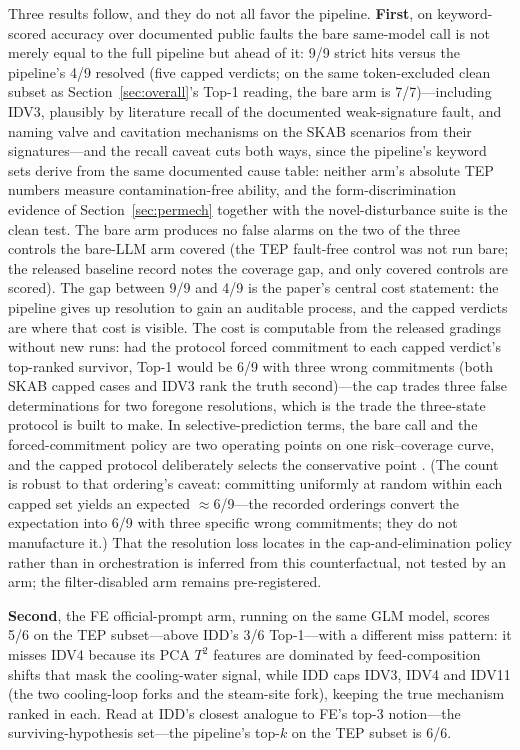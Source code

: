 \documentclass[preprint,10pt]{elsarticle}
\begin{document}
Three results follow, and they do not all favor the pipeline. \textbf{First}, on keyword-scored accuracy over documented public faults the bare same-model call is not merely equal to the full pipeline but ahead of it: 9/9 strict hits versus the pipeline's 4/9 resolved (five capped verdicts; on the same token-excluded clean subset as Section~\ref{sec:overall}'s Top-1 reading, the bare arm is 7/7)---including IDV3, plausibly by literature recall of the documented weak-signature fault, and naming valve and cavitation mechanisms on the SKAB scenarios from their signatures---and the recall caveat cuts both ways, since the pipeline's keyword sets derive from the same documented cause table: neither arm's absolute TEP numbers measure contamination-free ability, and the form-discrimination evidence of Section~\ref{sec:permech} together with the novel-disturbance suite is the clean test. The bare arm produces no false alarms on the two of the three controls the bare-LLM arm covered (the TEP fault-free control was not run bare; the released baseline record notes the coverage gap, and only covered controls are scored). The gap between 9/9 and 4/9 is the paper's central cost statement: the pipeline gives up resolution to gain an auditable process, and the capped verdicts are where that cost is visible. The cost is computable from the released gradings without new runs: had the protocol forced commitment to each capped verdict's top-ranked survivor, Top-1 would be 6/9 with three wrong commitments (both SKAB capped cases and IDV3 rank the truth second)---the cap trades three false determinations for two foregone resolutions, which is the trade the three-state protocol is built to make. In selective-prediction terms, the bare call and the forced-commitment policy are two operating points on one risk--coverage curve, and the capped protocol deliberately selects the conservative point \cite{chow1970optimum,angelopoulos2023conformal}. (The count is robust to that ordering's caveat: committing uniformly at random within each capped set yields an expected $\approx$6/9---the recorded orderings convert the expectation into 6/9 with three specific wrong commitments; they do not manufacture it.) That the resolution loss locates in the cap-and-elimination policy rather than in orchestration is inferred from this counterfactual, not tested by an arm; the filter-disabled arm remains pre-registered.

\textbf{Second}, the FE official-prompt arm, running on the same GLM model, scores 5/6 on the TEP subset---above IDD's 3/6 Top-1---with a different miss pattern: it misses IDV4 because its PCA $T^2$ features are dominated by feed-composition shifts that mask the cooling-water signal, while IDD caps IDV3, IDV4 and IDV11 (the two cooling-loop forks and the steam-site fork), keeping the true mechanism ranked in each. Read at IDD's closest analogue to FE's top-3 notion---the surviving-hypothesis set---the pipeline's top-$k$ on the TEP subset is 6/6.
\end{document}
